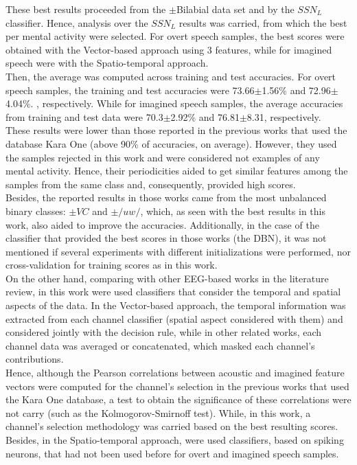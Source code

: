 These best results proceeded from the $\pm$Bilabial data set and by the $SSN_{L}$ classifier. Hence, analysis over the $SSN_{L}$ results was carried, from which the best per mental activity were selected. For overt speech samples, the best scores were obtained with the Vector-based approach using 3 features, while for imagined speech were with the Spatio-temporal approach.\\

Then, the average was computed across training and test accuracies. For overt speech samples, the training and test accuracies were 73.66$\pm$1.56\% and 72.96$\pm$4.04\%. , respectively. While for imagined speech samples, the average accuracies from training and test data were 70.3$\pm$2.92\% and 76.81$\pm$8.31, respectively.\\

These results were lower than those reported in the previous works that used the database Kara One (above 90\% of accuracies, on average). However, they used the samples rejected in this work and were considered not examples of any mental activity. Hence, their periodicities aided to get similar features among the samples from the same class and, consequently, provided high scores.\\

Besides, the reported results in those works came from the most unbalanced binary classes: $\pm VC$ and $\pm /uw/$, which, as seen with the best results in this work, also aided to improve the accuracies. Additionally, in the case of the classifier that provided the best scores in those works (the DBN), it was not mentioned if several experiments with different initializations were performed, nor cross-validation for training scores as in this work.\\

On the other hand, comparing with other EEG-based works in the literature review, in this work were used classifiers that consider the temporal and spatial aspects of the data. In the Vector-based approach, the temporal information was extracted from each channel classifier (spatial aspect considered with them) and considered jointly with the decision rule, while in other related works, each channel data was averaged or concatenated, which masked each channel's contributions.\\

Hence, although the Pearson correlations between acoustic and imagined feature vectors were computed for the channel's selection in the previous works that used the Kara One database, a test to obtain the significance of these correlations were not carry (such as the Kolmogorov-Smirnoff test). While, in this work, a channel's selection methodology was carried based on the best resulting scores. Besides, in the Spatio-temporal approach, were used classifiers, based on spiking neurons, that had not been used before for overt and imagined speech samples.\\

